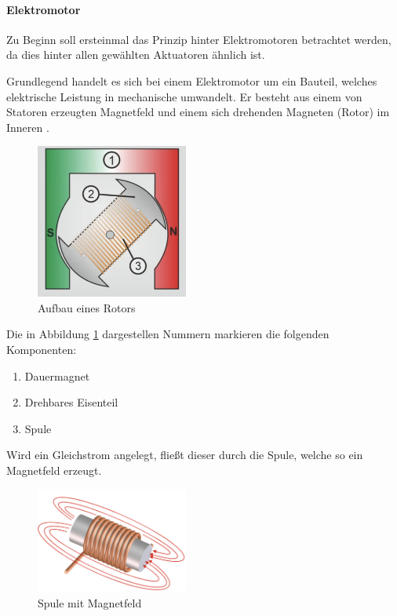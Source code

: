 \paragraph{Elektromotor}
Zu Beginn soll ersteinmal das Prinzip hinter Elektromotoren betrachtet werden, da dies hinter allen gewählten Aktuatoren ähnlich ist.

Grundlegend handelt es sich bei einem Elektromotor um ein Bauteil, welches elektrische Leistung in mechanische umwandelt.
Er besteht aus einem von Statoren erzeugten Magnetfeld und einem sich drehenden Magneten (Rotor) im Inneren \cite*[vgl.][]{Aufbau.Elektromotoren}.

\begin{figure}[htbp]
	\centering
	\includegraphics[width=5cm]{img/AufbauElektromagnet}
	\caption{Aufbau eines Rotors \cite*{Aufbau.Elektromotoren}}
	\label{fig:Elektromagnet}
\end{figure}

Die in Abbildung \ref{fig:Elektromagnet} dargestellen Nummern markieren die folgenden Komponenten:

\begin{enumerate}
	\item Dauermagnet %
	\item Drehbares Eisenteil
	\item Spule
\end{enumerate}

Wird ein Gleichstrom angelegt, fließt dieser durch die Spule, welche so ein Magnetfeld erzeugt.

\begin{figure}[htbp]
	\centering
	\includegraphics[width=5cm]{img/Magnetfeld}
	\caption{Spule mit Magnetfeld \cite*{Aufbau.Elektromotoren}}
	\label{fig:Magnetfeld}
\end{figure}

